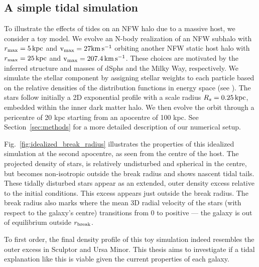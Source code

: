 \subsection{A simple tidal simulation}\label{a-simple-tidal-simulation}

To illustrate the effects of tides on an NFW halo due to a massive host,
we consider a toy model. We evolve an N-body realization of an NFW
subhalo with \(r_{\rm max}=5\,{\rm kpc}\) and \({\rm v}_{\rm max} = 27{\rm km\,s^{-1}}\) orbiting another
NFW static host halo with \(r_{\rm max}=25\,{\rm kpc}\) and
\({\rm v}_{\rm max} = 207.4\,{\rm km\,s^{-1}}\). These choices are motivated by the inferred
structure and masses of dSphs and the Milky Way, respectively. We
simulate the stellar component by assigning stellar weights to each
particle based on the relative densities of the distribution functions
in energy space (see \citet{ref:sec_painting_stars}). The stars follow
initially a 2D exponential profile with a scale radius
\(R_s=0.25\,{\rm kpc}\), embedded within the inner dark matter halo. We then
evolve the orbit through a pericentre of 20 kpc starting from an
apocentre of 100 kpc. See Section~\ref{sec:methods} for a more detailed
description of our numerical setup.

Fig.~\ref{fig:idealized_break_radius} illustrates the properties of this
idealized simulation at the second apocentre, as seen from the centre of
the host. The projected density of stars, is relatively undisturbed and
spherical in the centre, but becomes non-isotropic outside the break
radius and shows nascent tidal tails. These tidally disturbed stars
appear as an extended, outer density excess relative to the initial
conditions. This excess appears just outside the break radius. The break
radius also marks where the mean 3D radial velocity of the stars (with
respect to the galaxy's centre) transitions from 0 to positive --- the
galaxy is out of equilibrium outside \(r_{\rm break}\).

To first order, the final density profile of this toy simulation indeed
resembles the outer excess in Sculptor and Ursa Minor. This thesis aims
to investigate if a tidal explanation like this is viable given the
current properties of each galaxy.

